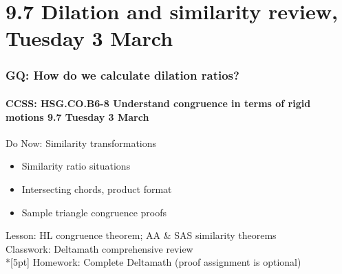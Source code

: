 \documentclass{beamer}
\begin{document}
\section{9.7 Dilation and similarity review, Tuesday 3 March}
\frame
{
  \frametitle{GQ: How do we calculate dilation ratios?}
  \framesubtitle{CCSS: HSG.CO.B6-8 Understand congruence in terms of rigid motions \hfill \alert{9.7 Tuesday 3 March}}
  \begin{block}{Do Now: Similarity transformations}
    \begin{itemize}
      \item Similarity ratio situations
      \item Intersecting chords, product format
      \item Sample triangle congruence proofs
    \end{itemize}
    \end{block}
    Lesson: HL congruence theorem; AA \& SAS similarity theorems \\
    Classwork: Deltamath comprehensive review \\*[5pt]
    Homework: Complete Deltamath (proof assignment is optional)
}
\end{document}
